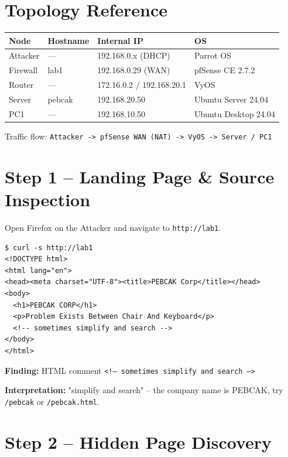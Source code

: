 \documentclass[a4paper, 12pt]{article}
\begin{document}
\section{Topology Reference}

\begin{table}[H]
\centering
\begin{tabularx}{\textwidth}{llll}
\toprule
\textbf{Node} & \textbf{Hostname} & \textbf{Internal IP} & \textbf{OS} \\
\midrule
Attacker & ---    & 192.168.0.x (DHCP)  & Parrot OS \\
Firewall & lab1   & 192.168.0.29 (WAN)  & pfSense CE 2.7.2 \\
Router   & ---    & 172.16.0.2 / 192.168.20.1 & VyOS \\
Server   & pebcak & 192.168.20.50       & Ubuntu Server 24.04 \\
PC1      & ---    & 192.168.10.50       & Ubuntu Desktop 24.04 \\
\bottomrule
\end{tabularx}
\end{table}

Traffic flow: \texttt{Attacker -> pfSense WAN (NAT) -> VyOS -> Server / PC1}

\section{Step 1 -- Landing Page \& Source Inspection}

Open Firefox on the Attacker and navigate to \texttt{http://lab1}.

\begin{lstlisting}
$ curl -s http://lab1
<!DOCTYPE html>
<html lang="en">
<head><meta charset="UTF-8"><title>PEBCAK Corp</title></head>
<body>
  <h1>PEBCAK CORP</h1>
  <p>Problem Exists Between Chair And Keyboard</p>
  <!-- sometimes simplify and search -->
</body>
</html>
\end{lstlisting}

\textbf{Finding:} HTML comment \texttt{<!-- sometimes simplify and search -->}

\textbf{Interpretation:} "simplify and search" -- the company name is PEBCAK,
try \texttt{/pebcak} or \texttt{/pebcak.html}.

\section{Step 2 -- Hidden Page Discovery}
\end{document}
